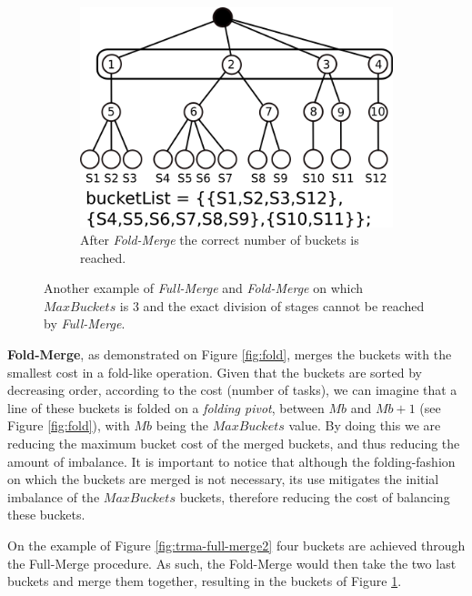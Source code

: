 \begin{figure}[t!]
\begin{subfigure}[t]{0.3\textwidth}
				\includegraphics[width=\textwidth]{img/trma-full-merge7}
				\caption{After {\em Fold-Merge} the correct number of buckets is reached.}
				\label{fig:trma-full-merge3}
		\end{subfigure}
		\caption{Another example of {\em Full-Merge} and {\em Fold-Merge} on which $MaxBuckets$ is 3 and the exact division of stages cannot be reached by {\em Full-Merge}.}
		\label{fig:trma-full-merge}
		\vspace{-3mm}

\end{figure}

\textbf{Fold-Merge}, as demonstrated on Figure \ref{fig:fold}, merges the buckets with the smallest cost in a fold-like operation. Given that the buckets are sorted by decreasing order, according to the cost (number of tasks), we can imagine that a line of these buckets is folded on a \textit{folding pivot}, between $Mb$ and $Mb+1$ (see Figure \ref{fig:fold}), with $Mb$ being the $MaxBuckets$ value. By doing this we are reducing the maximum bucket cost of the merged buckets, and thus reducing the amount of imbalance. It is important to notice that although the folding-fashion on which the buckets are merged is not necessary, its use mitigates the initial imbalance of the $MaxBuckets$ buckets, therefore reducing the cost of balancing these buckets. 

On the example of Figure \ref{fig:trma-full-merge2} four buckets are achieved through the Full-Merge procedure. As such, the Fold-Merge would then take the two last buckets and merge them together, resulting in the buckets of Figure \ref{fig:trma-full-merge3}.

